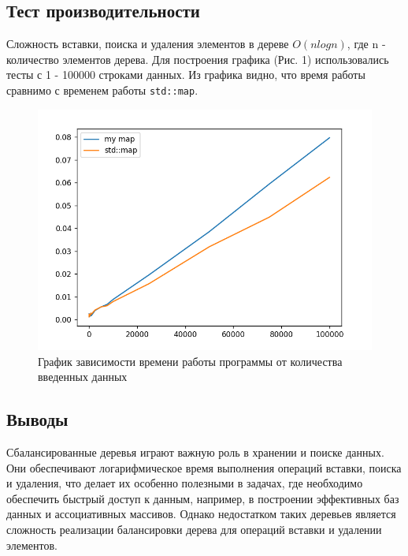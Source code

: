 \documentclass[12pt]{article}
\begin{document}
\newpage
\subsection*{Тест производительности}

Сложность вставки, поиска и удаления элементов в дереве $O(n log n)$, где n - количество элементов дерева.
Для построения графика (Рис. 1) использовались тесты с 1 - 100000 строками данных.
Из графика видно, что время работы сравнимо с временем работы \texttt{std::map}.

\begin{figure}
    \centering
    \includegraphics[width=\textwidth]{graph.png}
    \caption{График зависимости времени работы программы от количества введенных данных}
\end{figure}

\newpage
\subsection*{Выводы}

Сбалансированные деревья играют важную роль в хранении и поиске данных. Они обеспечивают логарифмическое время выполнения операций
вставки, поиска и удаления, что делает их особенно полезными в задачах, где необходимо обеспечить быстрый доступ к данным,
например, в построении эффективных баз данных и ассоциативных массивов. Однако недостатком таких деревьев является сложность реализации
балансировки дерева для операций вставки и удалении элементов.
\end{document}
